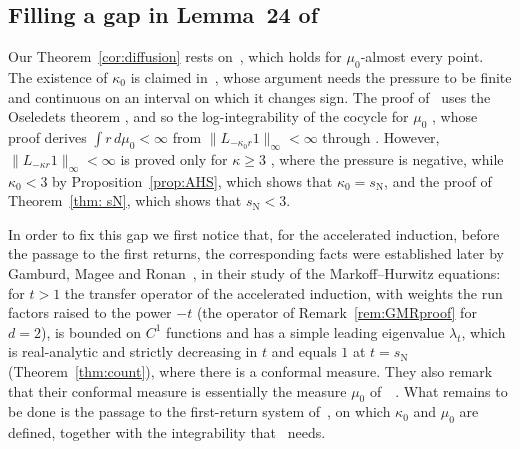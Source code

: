 \documentclass[11pt]{amsart}
\theoremstyle{definition}
\theoremstyle{remark}
\newcommand{\sN}{s_{\mathrm N}}
\newcommand{\norm}[1]{\lVert #1\rVert}
\begin{document}
\subsection*{Filling a gap in Lemma~24 of~\cite{AHSinv}}
\label{rem:AHS}
Our Theorem~\ref{cor:diffusion} rests on~\cite[Thm.~30]{AHSinv}, which holds for $\mu_0$-almost every point.
The existence of $\kappa_0$ is claimed in~\cite[Lemma~24]{AHSinv}, whose argument needs the pressure to be finite and continuous on an interval on which it changes sign.
The proof of~\cite[Thm.~30]{AHSinv} uses the Oseledets theorem \cite[Thm.~27]{AHSinv}, and so the log-integrability of the cocycle for $\mu_0$ \cite[Lemma~26]{AHSinv}, whose proof derives $\int r\,d\mu_0<\infty$ from $\norm{L_{-\kappa_0r}1}_\infty<\infty$ through \cite[Thm.~20]{AHSinv}.
However, $\norm{L_{-\kappa r}1}_\infty<\infty$ is proved only for $\kappa\ge3$ \cite[Thm.~15 and Thm.~19]{AHSinv}, where the pressure is negative, while $\kappa_0<3$ by Proposition~\ref{prop:AHS}, which shows that $\kappa_0=\sN$, and the proof of Theorem~\ref{thm: sN}, which shows that $\sN<3$.

In order to fix this gap we first notice that, for the accelerated induction, before the passage to the first returns, the corresponding facts were established later by Gamburd, Magee and Ronan~\cite[Thm.~10, Thm.~39 and Prop.~43]{GMR19}, in their study of the Markoff--Hurwitz equations: for $t>1$ the transfer operator of the accelerated induction, with weights the run factors raised to the power $-t$ (the operator of Remark~\ref{rem:GMRproof} for $d=2$), is bounded on $C^1$ functions and has a simple leading eigenvalue $\lambda_t$, which is real-analytic and strictly decreasing in $t$ and equals $1$ at $t=\sN$ (Theorem~\ref{thm:count}), where there is a conformal measure. They also remark that their conformal measure is essentially the measure $\mu_0$ of~\cite{AHSinv}~\cite[Remark~12]{GMR19}. What remains to be done is the passage to the first-return system of~\cite{AHSinv}, on which $\kappa_0$ and $\mu_0$ are defined, together with the integrability that~\cite[Lemma~26]{AHSinv} needs.
\end{document}
